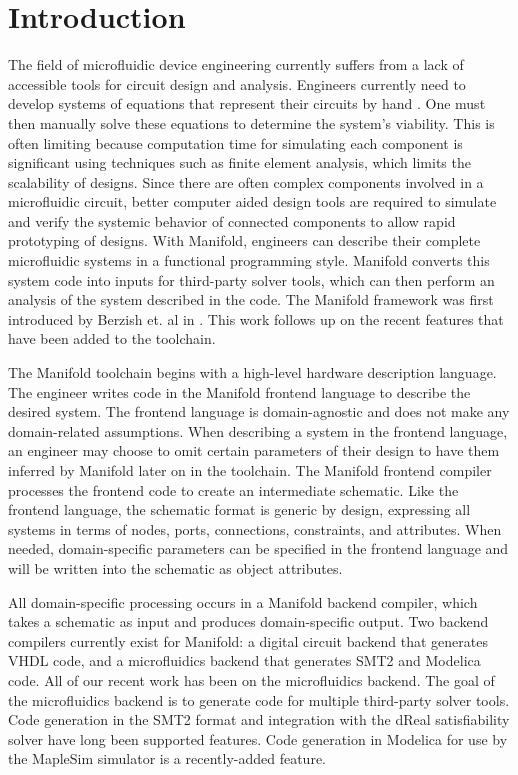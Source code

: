 \section{Introduction}

The field of microfluidic device engineering currently suffers from a lack of accessible tools for circuit design and analysis.
Engineers currently need to develop systems of equations that represent their circuits by hand \cite{Thorsen02science}.
One must then manually solve these equations to determine the system's viability. This is often limiting because computation time for simulating each component is significant using techniques such as finite element analysis, which limits the scalability of designs. Since there are often complex components involved in a microfluidic circuit, better computer aided design tools are required to simulate and verify the systemic behavior of connected components to allow rapid prototyping of designs.
With Manifold, engineers can describe their complete microfluidic systems in a functional programming style. 
Manifold converts this system code into inputs for third-party solver tools, which can then perform an analysis of the system described in the code.
The Manifold framework was first introduced by Berzish et. al in \cite{Berzish16cascon}.
This work follows up on the recent features that have been added to the toolchain.

The Manifold toolchain begins with a high-level hardware description language.
The engineer writes code in the Manifold frontend language to describe the desired system.
The frontend language is domain-agnostic and does not make any domain-related assumptions.
When describing a system in the frontend language, an engineer may choose to omit certain parameters of their design to have them inferred by Manifold later on in the toolchain.
The Manifold frontend compiler processes the frontend code to create an intermediate schematic.
Like the frontend language, the schematic format is generic by design, expressing all systems in terms of nodes, ports, connections, constraints, and attributes.
When needed, domain-specific parameters can be specified in the frontend language and will be written into the schematic as object attributes.

All domain-specific processing occurs in a Manifold backend compiler, which takes a schematic as input and produces domain-specific output.
Two backend compilers currently exist for Manifold: a digital circuit backend that generates VHDL code, and a microfluidics backend that generates SMT2 and Modelica code.
All of our recent work has been on the microfluidics backend.
The goal of the microfluidics backend is to generate code for multiple third-party solver tools.
Code generation in the SMT2 format and integration with the dReal satisfiability solver \cite{Gao13dReal} have long been supported features.
Code generation in Modelica for use by the MapleSim simulator is a recently-added feature.

